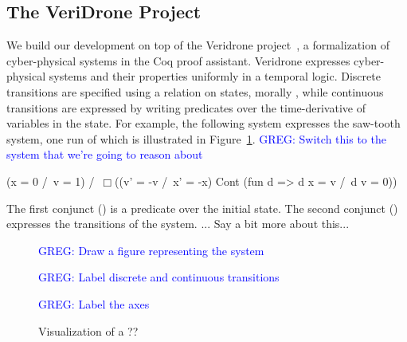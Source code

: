 \documentclass[preprint]{sigplanconf}
\newcommand{\greg}[1]{\textcolor{blue}{\textsc{GREG}: #1}}
\begin{document}

\subsection{The VeriDrone Project}
\label{sec:veridrone}

We build our development on top of the Veridrone project~\cite{ricketts2015veridrone}, a formalization of cyber-physical systems in the Coq proof assistant.
Veridrone expresses cyber-physical systems and their properties uniformly in a temporal logic.
Discrete transitions are specified using a relation on states, morally , while continuous transitions are expressed by writing predicates over the time-derivative of variables in the state.
For example, the following system expresses the saw-tooth system, one run of which is illustrated in Figure~\ref{fig:system-visualization}.
\greg{Switch this to the system that we're going to reason about}
\begin{coq}
(x = 0 /\ v = 1) /\ $\Box$((v' = -v /\ x' = -x) \/ Cont (fun d => d x = v /\ d v = 0))
\end{coq}
The first conjunct () is a predicate over the initial state.
The second conjunct () expresses the transitions of the system.
... Say a bit more about this...

\begin{figure}

\greg{Draw a figure representing the system}

\greg{Label discrete and continuous transitions}

\greg{Label the axes}

\caption{Visualization of a ??}
\label{fig:system-visualization}
\end{figure}


\end{document}
